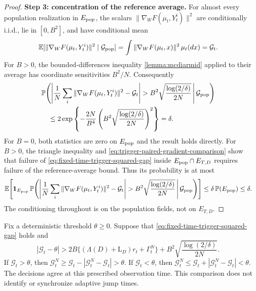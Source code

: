\begin{proof}
\par\noindent\textbf{Step 3: concentration of the reference average.}
For almost every population realization in $E_{\rm pop}$, the scalars
$\|\nabla_WF(\mu_t,Y_t^i)\|^2$ are conditionally i.i.d., lie in $[0,B^2]$,
and have conditional mean
\[
 \mathbb E[\|\nabla_WF(\mu_t,Y_t^i)\|^2\mid\mathcal G_{\rm pop}]
 =\int\|\nabla_WF(\mu_t,x)\|^2\,\mu_t(dx)=\mathcal G_t.
\]
For $B>0$, the bounded-differences inequality
\cref{lemma:mcdiarmid} applied to their average has coordinate
sensitivities $B^2/N$. Consequently
\begin{align*}
 &\mathbb P\!\left(
 \left|\frac1N\sum_i\|\nabla_WF(\mu_t,Y_t^i)\|^2-\mathcal G_t\right|
 >B^2\sqrt{\frac{\log(2/\delta)}{2N}}
 \,\middle|\,\mathcal G_{\rm pop}\right)\\
 &\quad\le
 2\exp\left\{-\frac{2N}{B^4}
       \left(B^2\sqrt{\frac{\log(2/\delta)}{2N}}\right)^2\right\}
 =\delta.
\end{align*}
For $B=0$, both statistics are zero on $E_{\rm pop}$ and the result
holds directly. For $B>0$, the triangle inequality and
\eqref{eq:trigger-paired-gradient-comparison} show that failure of
\eqref{eq:fixed-time-trigger-squared-gap} inside $E_{\rm pop}\cap E_{T,D}$
requires failure of the reference-average bound. Thus its probability
is at most
\[
 \mathbb E\!\left[\mathbf1_{E_{\rm pop}}\,
 \mathbb P\!\left(
 \left|\frac1N\sum_i\|\nabla_WF(\mu_t,Y_t^i)\|^2-\mathcal G_t\right|
 >B^2\sqrt{\frac{\log(2/\delta)}{2N}}
 \,\middle|\,\mathcal G_{\rm pop}\right)\right]
 \le\delta\,\mathbb P(E_{\rm pop})\le\delta.
\]
The conditioning throughout is on the population fields, not on
$E_{T,D}$.
\end{proof}

\begin{remark}
Fix a deterministic threshold $\theta\ge0$. Suppose that
\eqref{eq:fixed-time-trigger-squared-gap} holds and
\begin{equation}
 |\mathcal G_t-\theta|>
 2B\{(\Lambda(D)+\mathrm L_D)r_t+\Gamma_t^N\}
       +B^2\sqrt{\frac{\log(2/\delta)}{2N}}.
 \label{eq:trigger-margin-agreement}
\end{equation}
If $\mathcal G_t>\theta$, then
$\mathcal G_t^N\ge\mathcal G_t-|\mathcal G_t^N-\mathcal G_t|>\theta$.
If $\mathcal G_t<\theta$, then
$\mathcal G_t^N\le\mathcal G_t+|\mathcal G_t^N-\mathcal G_t|<\theta$.
The decisions agree at this prescribed observation time. This comparison
does not identify or synchronize adaptive jump times.
\end{remark}
